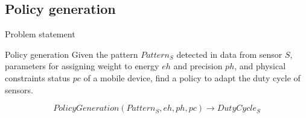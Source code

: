 \subsection{Policy generation}

\begin{frame}{Problem statement}
  \begin{exampleblock}{Policy generation}
    Given the pattern $Pattern_{S}$ detected in data from sensor $S$, parameters for assigning weight to energy $eh$ and precision $ph$, and physical constraints status $pc$ of a mobile device, find a policy to adapt the duty cycle of sensors.

    \begin{equation}
      PolicyGeneration( Pattern_{S}, eh, ph, pc ) \longrightarrow{} DutyCycle_{S}
    \end{equation}
  \end{exampleblock}
\end{frame}